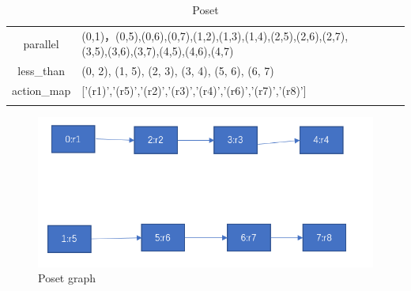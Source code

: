 \documentclass{article}
\begin{document}
 \begin{table}[]
 	\caption{Poset}	
 	\begin{tabular}{cllll}
 		\cline{1-2}	
 		
 		\multicolumn{1}{|c|}{parallel}    & \multicolumn{1}{l|}{(0,1)，(0,5),(0,6),(0,7),(1,2),(1,3),(1,4),(2,5),(2,6),(2,7),(3,5),(3,6),(3,7),(4,5),(4,6),(4,7)} &  &  &  \\ \cline{1-2}
 		\multicolumn{1}{|c|}{less\_than}  & \multicolumn{1}{l|}{(0, 2), (1, 5), (2, 3), (3, 4), (5, 6), (6, 7)}                                                  &  &  &  \\ \cline{1-2}
 		\multicolumn{1}{|c|}{action\_map} & \multicolumn{1}{l|}{{[}'(r1)','(r5)','(r2)','(r3)','(r4)','(r6)','(r7)','(r8)'{]}}                                   &  &  &  \\ \cline{1-2}
 		&                                                                                                                      &  &  & 
 		
 	\end{tabular}





 \end{table}	
 	\begin{figure}[htp]
	\centering
	\includegraphics[width=0.66\linewidth,height=0.4\linewidth]{fig/3.jpg}
	\caption{Poset graph}
\end{figure}
\end{document}
